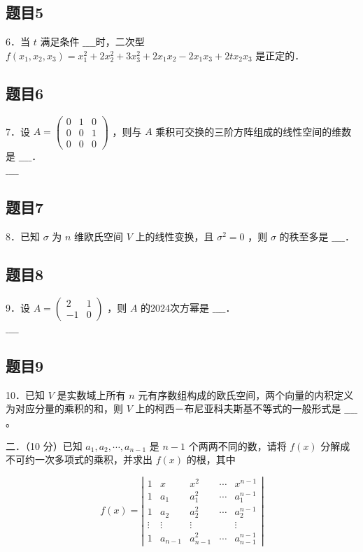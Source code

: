 \documentclass{article}
\begin{document}
\subsection{题目5}
6．当 \(t\) 满足条件 \(\_\_\_\_\)时，二次型 \(f\left(x_{1}, x_{2}, x_{3}\right)=x_{1}^{2}+2 x_{2}^{2}+3 x_{3}^{2}+2 x_{1} x_{2}-2 x_{1} x_{3}+2 t x_{2} x_{3}\) 是正定的．

\subsection{题目6}
7．设 \(A=\left(\begin{array}{lll}0 & 1 & 0 \\ 0 & 0 & 1 \\ 0 & 0 & 0\end{array}\right)\) ，则与 \(A\) 乘积可交换的三阶方阵组成的线性空间的维数是 \(\_\_\_\_\)．\\
\(\_\_\_\_\)

\subsection{题目7}
8．已知 \(\sigma\) 为 \(n\) 维欧氏空间 \(V\) 上的线性变换，且 \(\sigma^{2}=0\) ，则 \(\sigma\) 的秩至多是 \(\_\_\_\_\)．

\subsection{题目8}
9．设 \(A=\left(\begin{array}{cc}2 & 1 \\ -1 & 0\end{array}\right)\) ，则 \(A\) 的2024次方幂是 \(\_\_\_\_\)．\\
\(\_\_\_\_\)

\subsection{题目9}
10．已知 \(V\) 是实数域上所有 \(n\) 元有序数组构成的欧氏空间，两个向量的内积定义为对应分量的乘积的和，则 \(V\) 上的柯西－布尼亚科夫斯基不等式的一般形式是 \(\_\_\_\_\)。

二．（10 分）已知 \(a_{1}, a_{2}, \cdots, a_{n-1}\) 是 \(n-1\) 个两两不同的数，请将 \(f(x)\) 分解成不可约一次多项式的乘积，并求出 \(f(x)\) 的根，其中

\[
f(x)=\left|\begin{array}{ccccc}
1 & x & x^{2} & \cdots & x^{n-1} \\
1 & a_{1} & a_{1}^{2} & \cdots & a_{1}^{n-1} \\
1 & a_{2} & a_{2}^{2} & \cdots & a_{2}^{n-1} \\
\vdots & \vdots & \vdots & & \vdots \\
1 & a_{n-1} & a_{n-1}^{2} & \cdots & a_{n-1}^{n-1}
\end{array}\right|
\]
\end{document}
